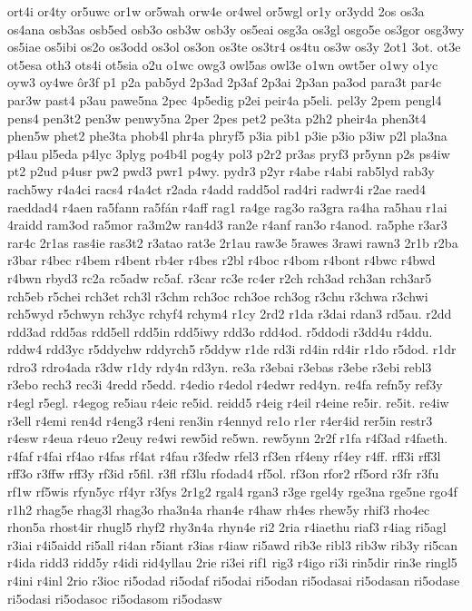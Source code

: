{ort4i
or4ty
or5uwc
or1w
or5wah
orw4e
or4wel
or5wgl
or1y
or3ydd
2os
os3a
os4ana
osb3as
osb5ed
osb3o
osb3w
osb3y
os5eai
osg3a
os3gl
osgo5e
os3gor
osg3wy
os5iae
os5ibi
os2o
os3odd
os3ol
os3on
os3te
os3tr4
os4tu
os3w
os3y
2ot1
3ot.
ot3e
ot5esa
oth3
ots4i
ot5sia
o2u
o1wc
owg3
owl5as
owl3e
o1wn
owt5er
o1wy
o1yc
oyw3
oy4we
ôr3f
p1
p2a
pab5yd
2p3ad
2p3af
2p3ai
2p3an
pa3od
para3t
par4c
par3w
past4
p3au
pawe5na
2pec
4p5edig
p2ei
peir4a
p5eli.
pel3y
2pem
pengl4
pens4
pen3t2
pen3w
penwy5na
2per
2pes
pet2
pe3ta
p2h2
pheir4a
phen3t4
phen5w
phet2
phe3ta
phob4l
phr4a
phryf5
p3ia
pib1
p3ie
p3io
p3iw
p2l
pla3na
p4lau
pl5eda
p4lyc
3plyg
po4b4l
pog4y
pol3
p2r2
pr3as
pryf3
pr5ynn
p2s
ps4iw
pt2
p2ud
p4usr
pw2
pwd3
pwr1
p4wy.
pydr3
p2yr
r4abe
r4abi
rab5lyd
rab3y
rach5wy
r4a4ci
racs4
r4a4ct
r2ada
r4add
radd5ol
rad4ri
radwr4i
r2ae
raed4
raeddad4
r4aen
ra5fann
ra5fán
r4aff
rag1
ra4ge
rag3o
ra3gra
ra4ha
ra5hau
r1ai
4raidd
ram3od
ra5mor
ra3m2w
ran4d3
ran2e
r4anf
ran3o
r4anod.
ra5phe
r3ar3
rar4c
2r1as
ras4ie
ras3t2
r3atao
rat3e
2r1au
raw3e
5rawes
3rawi
rawn3
2r1b
r2ba
r3bar
r4bec
r4bem
r4bent
rb4er
r4bes
r2bl
r4boc
r4bom
r4bont
r4bwc
r4bwd
r4bwn
rbyd3
rc2a
rc5adw
rc5af.
r3car
rc3e
rc4er
r2ch
rch3ad
rch3an
rch3ar5
rch5eb
r5chei
rch3et
rch3l
r3chm
rch3oc
rch3oe
rch3og
r3chu
r3chwa
r3chwi
rch5wyd
r5chwyn
rch3yc
rchyf4
rchym4
r1cy
2rd2
r1da
r3dai
rdan3
rd5au.
r2dd
rdd3ad
rdd5as
rdd5ell
rdd5in
rdd5iwy
rdd3o
rdd4od.
r5ddodi
r3dd4u
r4ddu.
rddw4
rdd3yc
r5ddychw
rddyrch5
r5ddyw
r1de
rd3i
rd4in
rd4ir
r1do
r5dod.
r1dr
rdro3
rdro4ada
r3dw
r1dy
rdy4n
rd3yn.
re3a
r3ebai
r3ebas
r3ebe
r3ebi
rebl3
r3ebo
rech3
rec3i
4redd
r5edd.
r4edio
r4edol
r4edwr
red4yn.
re4fa
refn5y
ref3y
r4egl
r5egl.
r4egog
re5iau
r4eic
re5id.
reidd5
r4eig
r4eil
r4eine
re5ir.
re5it.
re4iw
r3ell
r4emi
ren4d
r4eng3
r4eni
ren3in
r4ennyd
re1o
r1er
r4er4id
rer5in
restr3
r4esw
r4eua
r4euo
r2euy
re4wi
rew5id
re5wn.
rew5ynn
2r2f
r1fa
r4f3ad
r4faeth.
r4faf
r4fai
rf4ao
r4fas
rf4at
r4fau
r3fedw
rfel3
rf3en
rf4eny
rf4ey
r4ff.
rff3i
rff3l
rff3o
r3ffw
rff3y
rf3id
r5fil.
r3fl
rf3lu
rfodad4
rf5ol.
rf3on
rfor2
rf5ord
r3fr
r3fu
rf1w
rf5wis
rfyn5yc
rf4yr
r3fys
2r1g2
rgal4
rgan3
r3ge
rgel4y
rge3na
rge5ne
rgo4f
r1h2
rhag5e
rhag3l
rhag3o
rha3n4a
rhan4e
r4haw
rh4es
rhew5y
rhif3
rho4ec
rhon5a
rhost4ir
rhugl5
rhyf2
rhy3n4a
rhyn4e
ri2
2ria
r4iaethu
riaf3
r4iag
ri5agl
r3iai
r4i5aidd
ri5all
ri4an
r5iant
r3ias
r4iaw
ri5awd
rib3e
ribl3
rib3w
rib3y
ri5can
r4ida
ridd3
ridd5y
r4idi
rid4yllau
2rie
ri3ei
rif1
rig3
r4igo
ri3i
rin5dir
rin3e
ringl5
r4ini
r4inl
2rio
r3ioc
ri5odad
ri5odaf
ri5odai
ri5odan
ri5odasai
ri5odasan
ri5odase
ri5odasi
ri5odasoc
ri5odasom
ri5odasw
}
